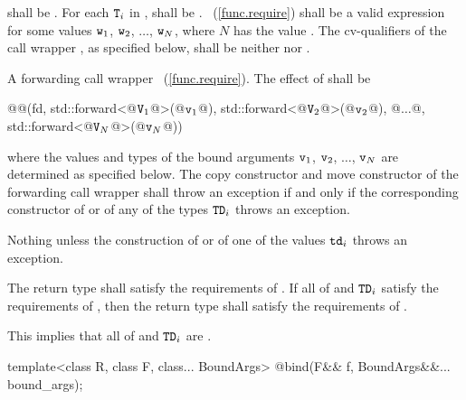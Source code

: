 \begin{itemdescr}
\pnum
\requires
{} shall be . For each $\texttt{T}_i$
in ,  shall be .
~(\ref{func.require}) shall be a valid expression for some
values $\texttt{w}_1$, $\texttt{w}_2$, $\dotsc{}$, $\texttt{w}_N$, where
$N$ has the value .
The cv-qualifiers \cv{} of the call wrapper ,
as specified below, shall be neither  nor .

\pnum\returns
A forwarding call wrapper ~(\ref{func.require}).
The effect of  shall
be
\begin{codeblock}
@@(fd, std::forward<@$\texttt{V}_1$@>(@$\texttt{v}_1$@), std::forward<@$\texttt{V}_2$@>(@$\texttt{v}_2$@), @$\dotsc$@, std::forward<@$\texttt{V}_N$@>(@$\texttt{v}_N$@))
\end{codeblock}
where the values and types of the bound
arguments $\texttt{v}_1$, $\texttt{v}_2$, $\dotsc$, $\texttt{v}_N$ are determined as specified below.
The copy constructor and move constructor of the forwarding call wrapper shall throw an
exception if and only if the corresponding constructor of  or of any of the types
$\texttt{TD}_i$ throws an exception.

\pnum
\throws Nothing unless the construction of
 or of one of the values $\texttt{td}_i$ throws an exception.

\pnum
\remarks The return type shall satisfy the requirements of . If all
of  and $\texttt{TD}_i$ satisfy the requirements of , then the
return type shall satisfy the requirements of . \begin{note} This implies
that all of  and $\texttt{TD}_i$ are . \end{note}
\end{itemdescr}

%
\begin{itemdecl}
template<class R, class F, class... BoundArgs>
  @\unspec@ bind(F&& f, BoundArgs&&... bound_args);
\end{itemdecl}

